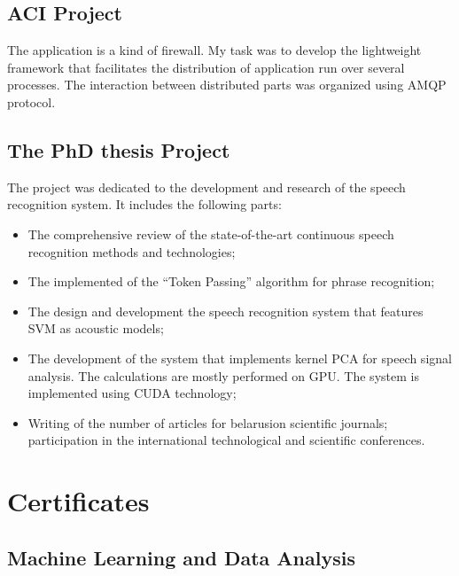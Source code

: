 \documentclass[11pt,a4paper,sans]{moderncv}        %
\begin{document}
\subsection{ACI Project}
The application is a kind of firewall. My task was to develop the lightweight framework that facilitates the distribution of application run over several processes. The interaction between distributed parts was organized using AMQP protocol.
\subsection{The PhD thesis Project}
The project was dedicated to the development and research of the speech recognition system. It includes the following parts:

\begin{itemize}
  \item The comprehensive review of the state-of-the-art continuous speech recognition methods and technologies;
  \item The implemented of the ``Token Passing'' algorithm for phrase recognition;
  \item The design and development the speech recognition system that features SVM as acoustic models;
  \item The development of the system that implements kernel PCA for speech signal analysis. The calculations are mostly performed on GPU. The system is implemented using CUDA technology;
  \item Writing of the number of articles for belarusion scientific journals;
participation in the international technological and scientific conferences.
\end{itemize}

\section{Certificates}

\subsection{Machine Learning and Data Analysis}
\end{document}
